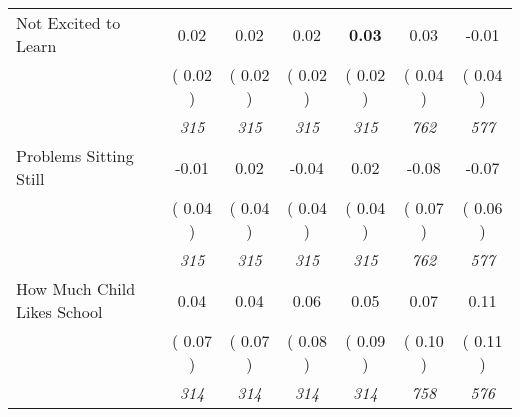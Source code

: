 \begin{tabular}{l c c c c c c}
Not Excited to Learn &      0.02 &      0.02 &      0.02 & \textbf{     0.03} &      0.03 &     -0.01 \\
& (     0.02 ) & (     0.02 ) & (     0.02 ) & (     0.02 ) & (     0.04 ) & (     0.04 ) \\
& \textit{ 315 } & \textit{ 315 } & \textit{ 315 } & \textit{ 315 } & \textit{ 762 } & \textit{ 577 } \\
Problems Sitting Still &     -0.01 &      0.02 &     -0.04 &      0.02 &     -0.08 &     -0.07 \\
& (     0.04 ) & (     0.04 ) & (     0.04 ) & (     0.04 ) & (     0.07 ) & (     0.06 ) \\
& \textit{ 315 } & \textit{ 315 } & \textit{ 315 } & \textit{ 315 } & \textit{ 762 } & \textit{ 577 } \\
How Much Child Likes School &      0.04 &      0.04 &      0.06 &      0.05 &      0.07 &      0.11 \\
& (     0.07 ) & (     0.07 ) & (     0.08 ) & (     0.09 ) & (     0.10 ) & (     0.11 ) \\
& \textit{ 314 } & \textit{ 314 } & \textit{ 314 } & \textit{ 314 } & \textit{ 758 } & \textit{ 576 } \\
\bottomrule
\end{tabular}
